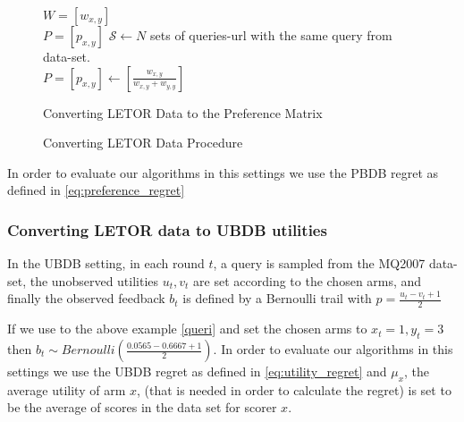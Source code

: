 \documentclass{llncs}
\begin{document}
\begin{figure}[h]
	\IncMargin{1em}
		\begin{algorithm}[H]
		
		$W =[w_{x,y}]$\\
		$P =[p_{x,y}]$
		\BlankLine
		$\mathcal{S} \leftarrow N$ sets of queries-url with the same query from data-set.\\
		$P =[p_{x,y}]\leftarrow \left[\frac{w_{x,y}}{w_{x,y}+w_{y,y}}\right]$

			\caption{Converting LETOR Data to the Preference Matrix}
		\end{algorithm}
		\caption{Converting LETOR Data Procedure}\label{data_converting}
	\end{figure}

In order to evaluate our algorithms in this settings we use the PBDB regret as defined in \eqref{eq:preference_regret}

\subsubsection{Converting LETOR data to UBDB utilities}

In the UBDB setting, in each round $t$, a query is sampled from the MQ2007 data-set, the unobserved utilities $u_t,v_t$ are set according to the chosen arms, and finally the observed feedback $b_t$ is defined by a Bernoulli trail with $ p = \frac{u_t -v_t+1}{2}$

If we use to the above example \eqref{queri} and set the chosen arms to $x_t = 1, y_t=3$ then $b_t \sim \textit{Bernoulli}\left(\frac{0.0565 -0.6667+1}{2}\right)$.
In order to evaluate our algorithms in this settings we use the UBDB regret as defined in \eqref{eq:utility_regret} and $\mu_x$, the average utility of arm $x$, (that is needed in order to calculate the regret) is set to be the average of scores in the data set for scorer $x$.
\end{document}
